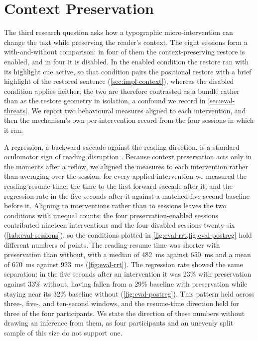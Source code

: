 \section{Context Preservation}
\label{sec:eval-context}

The third research question asks how a typographic micro-intervention can change the text while preserving the reader's context.
The eight sessions form a with-and-without comparison: in four of them the context-preserving restore is enabled, and in four it is disabled.
In the enabled condition the restore ran with its highlight cue active, so that condition pairs the positional restore with a brief highlight of the restored sentence (\cref{sec:impl-context}), whereas the disabled condition applies neither; the two are therefore contrasted as a bundle rather than as the restore geometry in isolation, a confound we record in \cref{sec:eval-threats}.
We report two behavioural measures aligned to each intervention, and then the mechanism's own per-intervention record from the four sessions in which it ran.

A regression, a backward saccade against the reading direction, is a standard oculomotor sign of reading disruption \cite{rayner1998eyemovements}.
Because context preservation acts only in the moments after a reflow, we aligned the measures to each intervention rather than averaging over the session: for every applied intervention we measured the reading-resume time, the time to the first forward saccade after it, and the regression rate in the five seconds after it against a matched five-second baseline before it.
Aligning to interventions rather than to sessions leaves the two conditions with unequal counts: the four preservation-enabled sessions contributed nineteen interventions and the four disabled sessions twenty-six (\cref{tab:eval-sessions}), so the conditions plotted in \cref{fig:eval-rrt,fig:eval-postreg} hold different numbers of points.
The reading-resume time was shorter with preservation than without, with a median of \SI{482}{\milli\second} against \SI{650}{\milli\second} and a mean of \SI{670}{\milli\second} against \SI{923}{\milli\second} (\cref{fig:eval-rrt}).
The regression rate showed the same separation: in the five seconds after an intervention it was 23\% with preservation against 33\% without, having fallen from a 29\% baseline with preservation while staying near its 32\% baseline without (\cref{fig:eval-postreg}).
This pattern held across three-, five-, and ten-second windows, and the resume-time direction held for three of the four participants.
We state the direction of these numbers without drawing an inference from them, as four participants and an unevenly split sample of this size do not support one.

